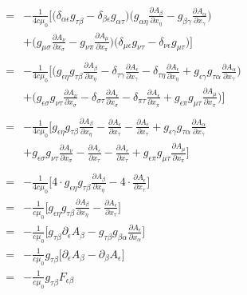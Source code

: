 \documentclass{article}
\begin{document}
\begin{align}
    = & -\frac{1}{4 c \mu_0}
    \bigg[
            \bigg(\delta_{\alpha\epsilon} g_{\tau\beta} - \delta_{\beta\epsilon}g_{\alpha\tau} \bigg)
            \bigg(g_{\alpha\eta} \frac{\partial A_\beta}{\partial x_\eta} - g_{\beta\gamma} \frac{\partial A_\alpha}{\partial x_\gamma} \bigg) \nonumber \\
        & + \bigg(g_{\mu\sigma} \frac{\partial A_\nu}{\partial x_\sigma} - g_{\nu\pi} \frac{\partial A_\mu}{\partial x_\pi} \bigg)
            \bigg( \delta_{\mu\epsilon}g_{\nu\tau} - \delta_{\nu\epsilon}g_{\mu\tau} \bigg)
    \bigg] \nonumber \\ \\
    = & -\frac{1}{4 c \mu_0}
    \bigg[
        \bigg(
            g_{\epsilon\eta}g_{\tau\beta}\frac{\partial A_\beta}{\partial x_\eta} - \delta_{\tau\gamma}\frac{\partial A_\epsilon}{\partial x_\gamma}
          - \delta_{\tau\eta}\frac{\partial A_\epsilon}{\partial x_\eta} + g_{\epsilon\gamma}g_{\tau\alpha}\frac{\partial A_\alpha}{\partial x_\gamma}
        \bigg) \nonumber \\
    & + \bigg(
           g_{\epsilon\sigma}g_{\nu\tau}\frac{\partial A_\nu}{\partial x_\sigma} - \delta_{\sigma\tau}\frac{\partial A_\epsilon}{\partial x_\sigma}
         - \delta_{\pi\tau}\frac{\partial A_\epsilon}{\partial x_\pi} + g_{\epsilon\pi}g_{\mu\tau}\frac{\partial A_\mu}{\partial x_\pi}
         \bigg)
    \bigg] \nonumber \\ \\
    = & -\frac{1}{4 c \mu_0}
    \bigg[
          g_{\epsilon\eta}g_{\tau\beta}\frac{\partial A_\beta}{\partial x_\eta} - \frac{\partial A_\epsilon}{\partial x_\tau}
          - \frac{\partial A_\epsilon}{\partial x_\tau} + g_{\epsilon\gamma}g_{\tau\alpha}\frac{\partial A_\alpha}{\partial x_\gamma} \nonumber \\
    & +   g_{\epsilon\sigma}g_{\nu\tau}\frac{\partial A_\nu}{\partial x_\sigma} - \frac{\partial A_\epsilon}{\partial x_\tau}
          - \frac{\partial A_\epsilon}{\partial x_\tau} + g_{\epsilon\pi}g_{\mu\tau}\frac{\partial A_\mu}{\partial x_\pi}
    \bigg] \nonumber \\ \\
    = & -\frac{1}{4 c \mu_0}
        \bigg[
          4 \cdot g_{\epsilon\eta}g_{\tau\beta}\frac{\partial A_\beta}{\partial x_\eta} - 4 \cdot \frac{\partial A_\epsilon}{\partial x_\tau}
        \bigg] \nonumber \\
    = & -\frac{1}{c \mu_0}
        \bigg[
          g_{\epsilon\eta}g_{\tau\beta}\frac{\partial A_\beta}{\partial x_\eta} - \frac{\partial A_\epsilon}{\partial x_\tau}
        \bigg] \nonumber \\
    = & -\frac{1}{c \mu_0}
        \bigg[
          g_{\tau\beta} \partial_\epsilon A_\beta - g_{\tau\beta}g_{\beta\alpha}\frac{\partial A_\epsilon}{\partial x_\alpha}
        \bigg] \nonumber \\
    = & -\frac{1}{c \mu_0} g_{\tau\beta}
        \bigg[
           \partial_\epsilon A_\beta - \partial_\beta A_\epsilon
        \bigg] \nonumber \\
    = & -\frac{1}{c \mu_0} g_{\tau\beta} F_{\epsilon\beta} \nonumber
\end{align}
\end{document}
